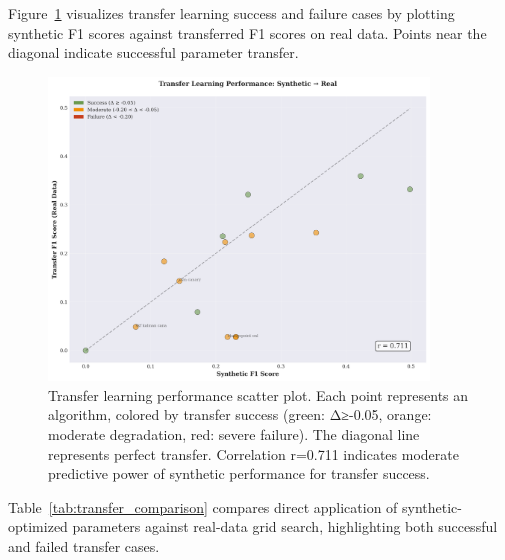 \documentclass[journal,article,submit,pdftex,moreauthors]{Definitions/mdpi}
\begin{document}
Figure~\ref{fig:transfer_scatter} visualizes transfer learning success and failure cases by plotting synthetic F1 scores against transferred F1 scores on real data. Points near the diagonal indicate successful parameter transfer.

\begin{figure}[ht]
\centering
\includegraphics[width=0.9\textwidth]{figures/fig_transfer_learning_scatter.png}
\caption{Transfer learning performance scatter plot. Each point represents an algorithm, colored by transfer success (green: Δ≥-0.05, orange: moderate degradation, red: severe failure). The diagonal line represents perfect transfer. Correlation r=0.711 indicates moderate predictive power of synthetic performance for transfer success.}
\label{fig:transfer_scatter}
\end{figure}

Table~\ref{tab:transfer_comparison} compares direct application of synthetic-optimized parameters against real-data grid search, highlighting both successful and failed transfer cases.
\end{document}
